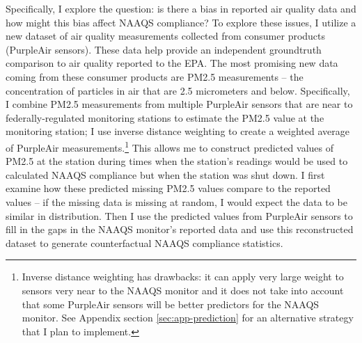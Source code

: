  









Specifically, I explore the question: is there a bias in reported air quality data and how might this bias affect NAAQS compliance?
To explore these issues, I utilize a new dataset of air quality measurements collected from consumer products (PurpleAir sensors).
%
These data help provide an independent groundtruth comparison to air quality reported to the EPA.
%
The most promising new data coming from these consumer products are PM2.5 measurements -- the concentration of particles in air that are 2.5 micrometers and below.
%
Specifically, I combine PM2.5 measurements from multiple PurpleAir sensors that are near to federally-regulated monitoring stations to estimate the PM2.5 value at the monitoring station; I use inverse distance weighting to create a weighted average of PurpleAir measurements.\footnote{Inverse distance weighting has drawbacks: it can apply very large weight to sensors very near to the NAAQS monitor and it does not take into account that some PurpleAir sensors will be better predictors for the NAAQS monitor. See Appendix section \ref{sec:app-prediction} for an alternative strategy that I plan to implement.}
%
This allows me to construct predicted values of PM2.5 at the station during times when the station's readings would be used to calculated NAAQS compliance but when the station was shut down.
%
I first examine how these predicted missing PM2.5 values compare to the reported values -- if the missing data is missing at random, I would expect the data to be similar in distribution. Then I use the predicted values from PurpleAir sensors to fill in the gaps in the NAAQS monitor's reported data and use this reconstructed dataset to generate counterfactual NAAQS compliance statistics.


